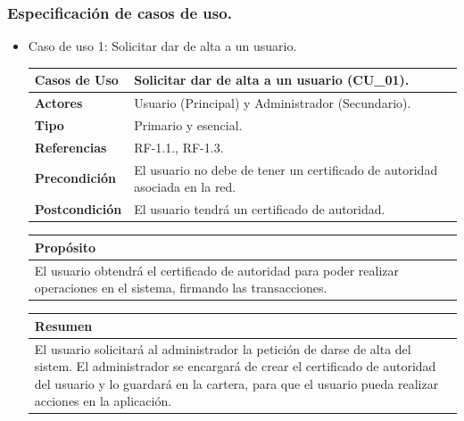 \newpage

\subsubsection{Especificación de casos de uso.}

\begin{itemize}
    \item Caso de uso 1: Solicitar dar de alta a un usuario.
    
    \begin{table}[h!]
        \centering
        \begin{tabular}{|l|p{}|}
            \hline
            \textbf{Casos de Uso}   &   Solicitar dar de alta a un usuario (CU\_01). \\
            \hline 
            \textbf{Actores}        &   Usuario (Principal) y Administrador (Secundario). \\ 
            \hline 
            \textbf{Tipo}           &   Primario y esencial. \\
            \hline
            \textbf{Referencias}    &   RF-1.1., RF-1.3. \\ 
            \hline
            \textbf{Precondición}   &   El usuario no debe de tener un certificado de autoridad asociada en la red. \\ 
            \hline
            \textbf{Postcondición}  &   El usuario tendrá un certificado de autoridad. \\ 
            \hline
        \end{tabular}
        
        \vspace{5mm}
        
        \begin{tabular}{|p{\textwidth}|}
            \hline
            \rowcolor{SeaGreen} \textbf{Propósito} \\
            \hline
            \multicolumn{1}{|p{12cm}|}{El usuario obtendrá el certificado de autoridad para poder realizar operaciones en el sistema, firmando las 
            transacciones.} \\ [0.5ex]
            \hline
        \end{tabular}
        
        \vspace{5mm}
        
        \begin{tabular}{|p{\textwidth}|}
            \hline
            \rowcolor{SeaGreen} \textbf{Resumen} \\
            \hline
            \multicolumn{1}{|p{12cm}|}{El usuario solicitará al administrador la petición de darse de alta del sistem. El administrador se encargará de 
            crear el certificado de autoridad del usuario y lo guardará en la cartera, para que el usuario pueda realizar acciones en la 
            aplicación.} \\ [0.5ex]
            \hline
        \end{tabular}
        

\end{table}
\end{itemize}
